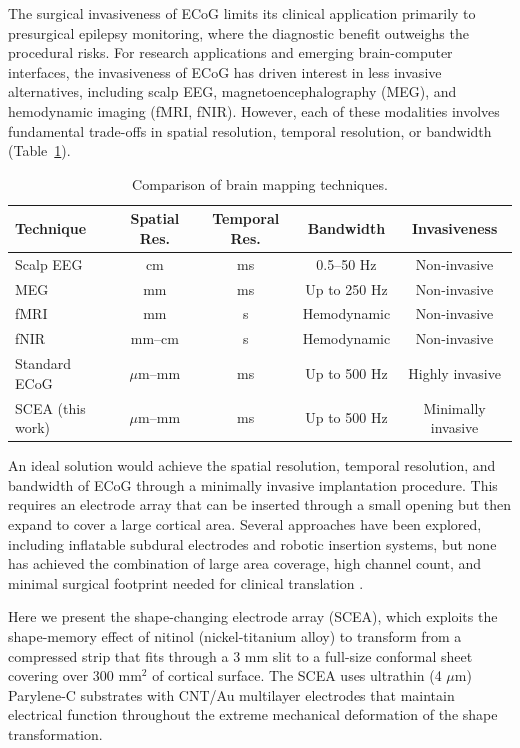 \documentclass[11pt]{article}
\begin{document}
The surgical invasiveness of ECoG limits its clinical application primarily to presurgical epilepsy monitoring, where the diagnostic benefit outweighs the procedural risks. For research applications and emerging brain-computer interfaces, the invasiveness of ECoG has driven interest in less invasive alternatives, including scalp EEG, magnetoencephalography (MEG), and hemodynamic imaging (fMRI, fNIR). However, each of these modalities involves fundamental trade-offs in spatial resolution, temporal resolution, or bandwidth (Table~\ref{tab:comparison}).

\begin{table}[h]
\centering
\caption{Comparison of brain mapping techniques.}
\label{tab:comparison}
\begin{tabular}{lcccc}
\toprule
Technique & Spatial Res. & Temporal Res. & Bandwidth & Invasiveness \\
\midrule
Scalp EEG & cm & ms & 0.5--50 Hz & Non-invasive \\
MEG & mm & ms & Up to 250 Hz & Non-invasive \\
fMRI & mm & s & Hemodynamic & Non-invasive \\
fNIR & mm--cm & s & Hemodynamic & Non-invasive \\
Standard ECoG & $\mu$m--mm & ms & Up to 500 Hz & Highly invasive \\
SCEA (this work) & $\mu$m--mm & ms & Up to 500 Hz & Minimally invasive \\
\bottomrule
\end{tabular}
\end{table}

An ideal solution would achieve the spatial resolution, temporal resolution, and bandwidth of ECoG through a minimally invasive implantation procedure. This requires an electrode array that can be inserted through a small opening but then expand to cover a large cortical area. Several approaches have been explored, including inflatable subdural electrodes and robotic insertion systems, but none has achieved the combination of large area coverage, high channel count, and minimal surgical footprint needed for clinical translation \citep{rogers2010,viventi2011}.

Here we present the shape-changing electrode array (SCEA), which exploits the shape-memory effect of nitinol (nickel-titanium alloy) to transform from a compressed strip that fits through a 3 mm slit to a full-size conformal sheet covering over 300 mm$^{2}$ of cortical surface. The SCEA uses ultrathin (4 $\mu$m) Parylene-C substrates with CNT/Au multilayer electrodes that maintain electrical function throughout the extreme mechanical deformation of the shape transformation.
\end{document}
